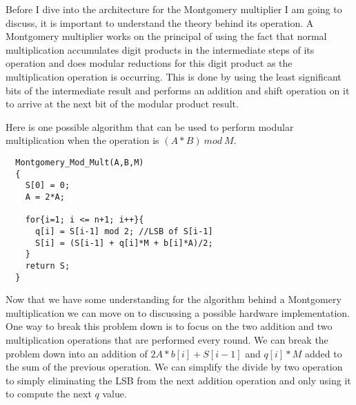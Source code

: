 \documentclass[journal]{IEEEtran}
\begin{document}
Before I dive into the architecture for the Montgomery multiplier I am going to discuss, it is important to understand the theory behind its operation. A Montgomery multiplier works on the principal of using the fact that normal multiplication accumulates digit products in the intermediate steps of its operation and does modular reductions for this digit product as the multiplication operation is occurring. This is done by using the least significant bits of the intermediate result and performs an addition and shift operation on it to arrive at the next bit of the modular product result. 

Here is one possible algorithm that can be used to perform modular multiplication when the operation is $(A * B)\ mod\ M$. \\

\begin{lstlisting}
  Montgomery_Mod_Mult(A,B,M)
  {
    S[0] = 0;
    A = 2*A;
	  
    for{i=1; i <= n+1; i++}{
      q[i] = S[i-1] mod 2; //LSB of S[i-1]
      S[i] = (S[i-1] + q[i]*M + b[i]*A)/2;
    }
    return S;
  }
\end{lstlisting}

Now that we have some understanding for the algorithm behind a Montgomery multiplication we can move on to discussing a possible hardware implementation. One way to break this problem down is to focus on the two addition and two multiplication operations that are performed every round. We can break the problem down into an addition of $2A*b[i] + S[i-1]$ and $q[i]*M$ added to the sum of the previous operation. We can simplify the divide by two operation to simply eliminating the LSB from the next addition operation and only using it to compute the next $q$ value.    






%
%
\end{document}
